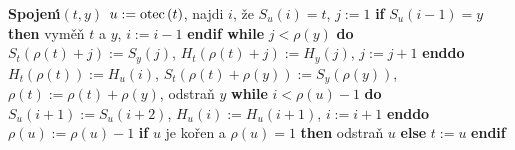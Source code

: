 {\bf Spojen\'\i$\left(t,y\right)$\newline 
$u:=\operatorname{otec}\left(t\right)$}, najdi $i$, \v ze $S_u\left(i\right)=t$, $j:=1$\newline 
{\bf if} $S_u\left(i-1\right)=y$ {\bf then} vym\v e\v n $t$ a $y$, $i:=i-1$ {\bf endif\newline 
while} $j<\rho \left(y\right)$ {\bf do}\newline 
\phantom{---}$S_t\left(\rho \left(t\right)+j\right):=S_y\left(j\right)$, $H_t\left(\rho \left(t\right)+j\right):=H_y\left(j\right)$, $j:=j+1$\newline 
{\bf enddo}\newline 
$H_t\left(\rho \left(t\right)\right):=H_u\left(i\right)$, $S_t\left(\rho \left(t\right)+\rho \left(y\right)\right):=S_y\left(\rho \left(y\right)\right)$, $
\rho \left(t\right):=\rho \left(t\right)+\rho \left(y\right)$, odstra\v n $y$\newline 
{\bf while} $i<\rho \left(u\right)-1$ {\bf do}\newline 
\phantom{---}$S_u\left(i+1\right):=S_u\left(i+2\right)$, $H_u\left(i\right):=H_u\left(i+1\right)$, $i:=i+1$\newline 
{\bf enddo}\newline 
$\rho \left(u\right):=\rho \left(u\right)-1$\newline 
{\bf if} $u$ je ko\v ren a $\rho \left(u\right)=1$ {\bf then}\newline 
\phantom{---}odstra\v n $u$\newline 
{\bf else}\newline 
\phantom{---}$t:=u$\newline 
{\bf endif}
\medskip

